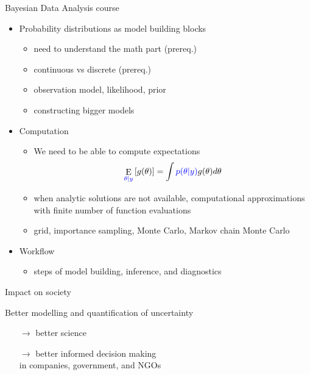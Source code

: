 \documentclass[english,t]{beamer}
\DeclareMathOperator{\E}{E}
\begin{document}
\begin{frame}{Bayesian Data Analysis course}

  \begin{itemize}
  \item Probability distributions as model building blocks
    \begin{itemize}
    \item need to understand the math part (prereq.)
    \item continuous vs discrete (prereq.)
    \item observation model, likelihood, prior
    \item constructing bigger models
    \end{itemize}
  \item<2-> Computation
    \begin{itemize}
    \item 
  We need to be able to compute expectations%
  \begin{align*}
    \E_{\color{blue}{\theta|y}}\left[ g(\theta) \right] = \int {\color{blue}p(\theta|y)}g(\theta) d\theta
  \end{align*}
    \item when analytic solutions are not available, computational
      approximations with finite number of function evaluations
    \item grid, importance sampling, Monte Carlo, Markov chain Monte Carlo
    \end{itemize}
  \item<3-> Workflow
    \begin{itemize}
    \item steps of model building, inference, and diagnostics
    \end{itemize}
  \end{itemize}
  
\end{frame}

\begin{frame}{Impact on society}

  \vspace{\baselineskip}
    Better modelling and quantification of uncertainty\\
  \hspace{0.5cm}  \begin{minipage}[t]{0.8\linewidth}
  \vspace{0.5\baselineskip}
    
  \begin{itemize}
  \item[$\rightarrow$] better science
  \vspace{\baselineskip}
  
\item[$\rightarrow$] better informed decision making\\ in companies, government, and NGOs
\end{itemize}
\end{minipage}

\end{frame}
\end{document}
